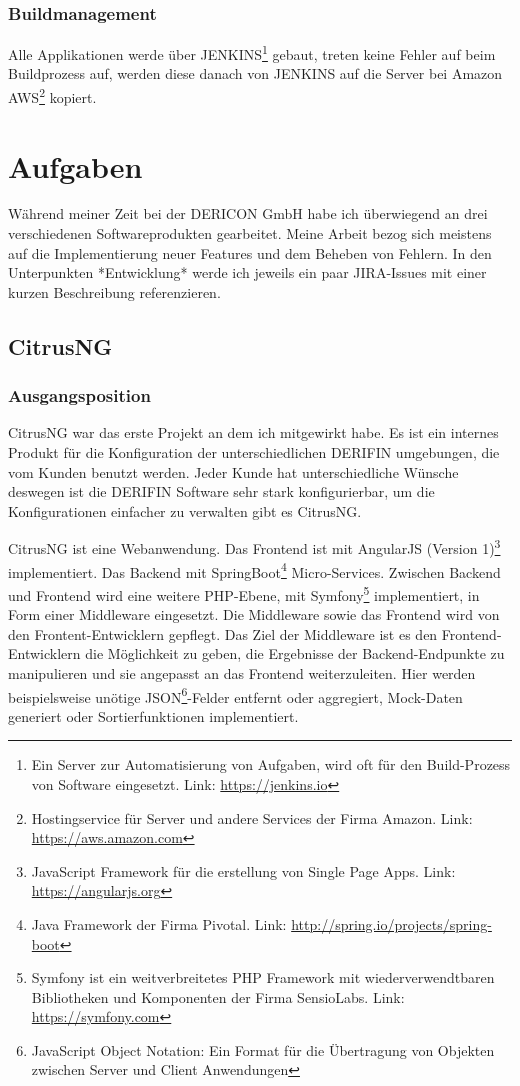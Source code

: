 \documentclass[chapterprefix=false, 12pt, a4paper, oneside, parskip=half, listof=totoc, bibliography=totoc, numbers=noendperiod]{scrbook}
\begin{document}
    \subsection{Buildmanagement}

    Alle Applikationen werde über JENKINS\footnote{Ein Server zur Automatisierung von Aufgaben, wird oft für den Build-Prozess von Software eingesetzt. Link: \url{https://jenkins.io}} gebaut,
    treten keine Fehler auf beim Buildprozess auf, werden diese danach von JENKINS auf die Server bei Amazon AWS\footnote{Hostingservice für Server und andere Services der Firma Amazon. Link: \url{https://aws.amazon.com}} kopiert.

    \chapter{Aufgaben}

    Während meiner Zeit bei der DERICON GmbH habe ich überwiegend an drei verschiedenen Softwareprodukten gearbeitet.
    Meine Arbeit bezog sich meistens auf die Implementierung neuer Features und dem Beheben von Fehlern. In den Unterpunkten *Entwicklung*
    werde ich jeweils ein paar JIRA-Issues mit einer kurzen Beschreibung referenzieren.

    \section{CitrusNG}

    \subsection{Ausgangsposition}

    CitrusNG war das erste Projekt an dem ich mitgewirkt habe. Es ist ein internes Produkt für die Konfiguration der unterschiedlichen DERIFIN umgebungen, die
    vom Kunden benutzt werden. Jeder Kunde hat unterschiedliche Wünsche deswegen ist die DERIFIN Software sehr stark konfigurierbar, um die Konfigurationen einfacher
    zu verwalten gibt es CitrusNG.

    CitrusNG ist eine Webanwendung. Das Frontend ist mit AngularJS (Version 1)\footnote{JavaScript Framework für die erstellung von Single Page Apps. Link: \url{https://angularjs.org}} implementiert.
    Das Backend mit SpringBoot\footnote{Java Framework der Firma Pivotal. Link: \url{http://spring.io/projects/spring-boot}} Micro-Services.
    Zwischen Backend und Frontend wird eine weitere PHP-Ebene, mit Symfony\footnote{Symfony ist ein weitverbreitetes PHP Framework mit wiederverwendtbaren Bibliotheken und Komponenten der Firma SensioLabs. Link: \url{https://symfony.com}}
    implementiert, in Form einer Middleware eingesetzt. Die Middleware sowie das Frontend wird von den Frontent-Entwicklern gepflegt.
    Das Ziel der Middleware ist es den Frontend-Entwicklern die Möglichkeit zu geben, die Ergebnisse der
    Backend-Endpunkte zu manipulieren und sie angepasst an das Frontend weiterzuleiten. 
    Hier werden beispielsweise unötige JSON\footnote{JavaScript Object Notation: Ein Format für die Übertragung von Objekten zwischen Server und Client Anwendungen}-Felder entfernt oder
    aggregiert, Mock-Daten generiert oder Sortierfunktionen implementiert.
\end{document}
